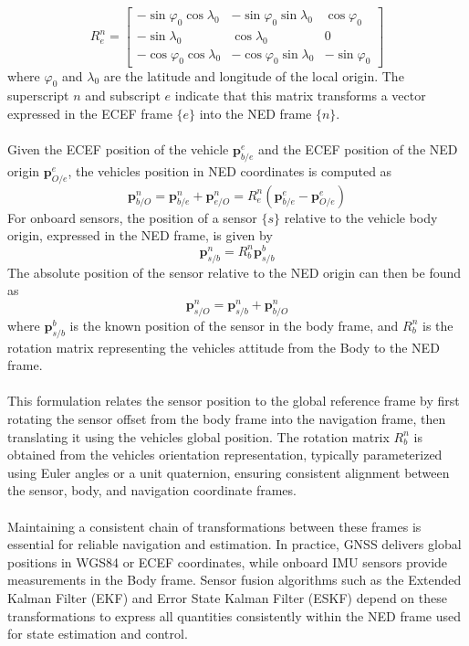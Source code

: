 $$
    R_{e}^{n} =
    \begin{bmatrix}
        -\sin\varphi_0\cos\lambda_0 & -\sin\varphi_0\sin\lambda_0 & \cos\varphi_0 \\
        -\sin\lambda_0 & \cos\lambda_0 & 0 \\
        -\cos\varphi_0\cos\lambda_0 & -\cos\varphi_0\sin\lambda_0 & -\sin\varphi_0
    \end{bmatrix}
$$
where $\varphi_0$ and $\lambda_0$ are the latitude and longitude of the local origin. The superscript $n$ and subscript $e$ indicate that this matrix transforms a vector expressed in the ECEF frame $\{e\}$ into the NED frame $\{n\}$.  
\\ \\
Given the ECEF position of the vehicle $\mathbf{p}_{b/e}^{e}$ and the ECEF position of the NED origin $\mathbf{p}_{O/e}^{e}$, the vehicles position in NED coordinates is computed as
$$
    \mathbf{p}_{b/O}^{n} = \mathbf{p}_{b/e}^{n} + \mathbf{p}_{e/O}^{n} = R_e^n (\mathbf{p}_{b/e}^{e} - \mathbf{p}_{O/e}^{e})
$$
For onboard sensors, the position of a sensor $\{s\}$ relative to the vehicle body origin, expressed in the NED frame, is given by
$$
\mathbf{p}_{s/b}^{n} = R_b^n \mathbf{p}_{s/b}^{b}
$$
The absolute position of the sensor relative to the NED origin can then be found as
$$
\mathbf{p}_{s/O}^{n} = \mathbf{p}_{s/b}^{n} + \mathbf{p}_{b/O}^{n}
$$
where $\mathbf{p}_{s/b}^{b}$ is the known position of the sensor in the body frame, and $R_b^n$ is the rotation matrix representing the vehicles attitude from the Body to the NED frame.
\\ \\
This formulation relates the sensor position to the global reference frame by first rotating the sensor offset from the body frame into the navigation frame, then translating it using the vehicles global position. The rotation matrix $R_b^n$ is obtained from the vehicles orientation representation, typically parameterized using Euler angles or a unit quaternion, ensuring consistent alignment between the sensor, body, and navigation coordinate frames.
\\ \\
Maintaining a consistent chain of transformations between these frames is essential for reliable navigation and estimation. In practice, GNSS delivers global positions in WGS84 or ECEF coordinates, while onboard IMU sensors provide measurements in the Body frame. Sensor fusion algorithms such as the Extended Kalman Filter (EKF) and Error State Kalman Filter (ESKF) depend on these transformations to express all quantities consistently within the NED frame used for state estimation and control.

